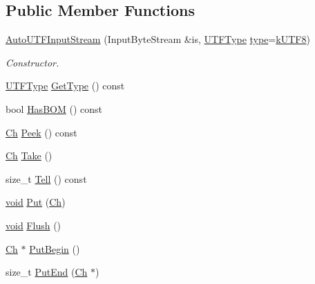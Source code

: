 \subsection*{Public Member Functions}
\begin{DoxyCompactItemize}
\item 
\hyperlink{classAutoUTFInputStream_a83837fced0971ba26dd9a8ec1575abb0}{Auto\+U\+T\+F\+Input\+Stream} (Input\+Byte\+Stream \&is, \hyperlink{encodings_8h_ac9448aedf514a5bb509bae73a9ce4e58}{U\+T\+F\+Type} \hyperlink{imgui__impl__opengl3__loader_8h_a63267399cd2a2ee217572c11d2e54f07}{type}=\hyperlink{encodings_8h_ac9448aedf514a5bb509bae73a9ce4e58a7fd9945f1c494a4a4ee9446017e790f1}{k\+U\+T\+F8})
\begin{DoxyCompactList}\small\item\em Constructor. \end{DoxyCompactList}\item 
\hyperlink{encodings_8h_ac9448aedf514a5bb509bae73a9ce4e58}{U\+T\+F\+Type} \hyperlink{classAutoUTFInputStream_ad8e8b71e852db11a841fbba40431c5d1}{Get\+Type} () const
\item 
bool \hyperlink{classAutoUTFInputStream_a8831def623c28a3ec1d59b75abe5b20e}{Has\+B\+OM} () const
\item 
\hyperlink{classAutoUTFInputStream_a3bb3eb46f2c20404a7ac21963cfe348f}{Ch} \hyperlink{classAutoUTFInputStream_a616fbe24878a2026fbc7743acb50438c}{Peek} () const
\item 
\hyperlink{classAutoUTFInputStream_a3bb3eb46f2c20404a7ac21963cfe348f}{Ch} \hyperlink{classAutoUTFInputStream_a652cd1ae8bd848a5ecce4efa1ebd0f38}{Take} ()
\item 
size\+\_\+t \hyperlink{classAutoUTFInputStream_a6b847c75309e4ed36957f232b9ce88d1}{Tell} () const
\item 
\hyperlink{imgui__impl__opengl3__loader_8h_ac668e7cffd9e2e9cfee428b9b2f34fa7}{void} \hyperlink{classAutoUTFInputStream_a5ea730d1ab715f58ce4f9e3dcd77810a}{Put} (\hyperlink{classAutoUTFInputStream_a3bb3eb46f2c20404a7ac21963cfe348f}{Ch})
\item 
\hyperlink{imgui__impl__opengl3__loader_8h_ac668e7cffd9e2e9cfee428b9b2f34fa7}{void} \hyperlink{classAutoUTFInputStream_aecc08f52794d761fc1b729907a83dcf8}{Flush} ()
\item 
\hyperlink{classAutoUTFInputStream_a3bb3eb46f2c20404a7ac21963cfe348f}{Ch} $\ast$ \hyperlink{classAutoUTFInputStream_a761841842c147c0bb1a69bfacbc117a2}{Put\+Begin} ()
\item 
size\+\_\+t \hyperlink{classAutoUTFInputStream_a41bd66602f82d344383792feac34f9f7}{Put\+End} (\hyperlink{classAutoUTFInputStream_a3bb3eb46f2c20404a7ac21963cfe348f}{Ch} $\ast$)
\end{DoxyCompactItemize}
